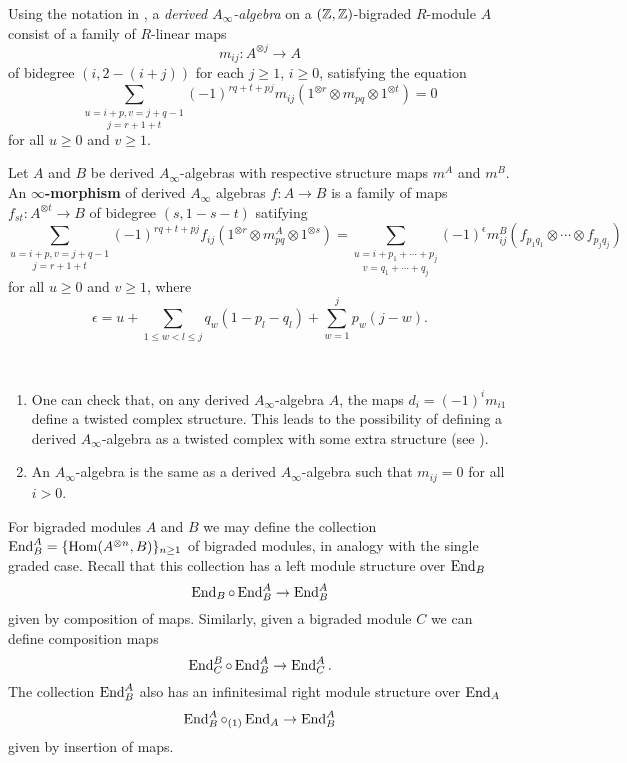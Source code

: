 \documentclass[twoside]{article}
\begin{document}
  \begin{defin}
  Using the notation in \cite{RW}, a \emph{derived $A_\infty$-algebra} on a $(\mathbb{Z},\mathbb{Z})$-bigraded $R$-module $A$ consist of a family of $R$-linear maps 
\[m_{ij}:A^{\otimes j}\to A\]
of bidegree $(i,2-(i+j))$ for each $j\geq 1$, $i\geq 0$, satisfying the equation
\[\underset{j=r+1+t}{\sum_{u=i+p, v=j+q-1}}(-1)^{rq+t+pj}m_{ij}(1^{\otimes r}\otimes m_{pq}\otimes 1^{\otimes t})=0\]
for all $u\geq 0$ and $v\geq 1$. 
\end{defin}

\begin{defin}
Let $A$ and $B$ be derived $A_\infty$-algebras with respective structure maps $m^A$ and $m^B$. An $\infty$\textbf{-morphism} of derived $A_\infty$ algebras $f:A\to B$ is a family of maps $f_{st}:A^{\otimes t}\to B$ of bidegree $(s,1-s-t)$ satifying
\begin{equation}\label{dinftymaps}
\underset{j=r+1+t}{\sum_{u=i+p, v=j+q-1}}(-1)^{rq+t+pj}f_{ij}(1^{\otimes r}\otimes m_{pq}^A\otimes 1^{\otimes s})=\underset{v=q_1+\cdots +q_j}{\sum_{u=i+p_1+\cdots +p_j}}(-1)^{\epsilon} m^B_{ij}(f_{p_1 q_1}\otimes\cdots\otimes f_{p_j q_j})
\end{equation}
for all $u\geq 0$ and $v\geq 1$, where
\[\epsilon = u + \sum_{1\leq w < l \leq j} q_w(1-p_l-q_l)  + \sum_{w=1}^j p_w(j-w).\]
\end{defin}
\begin{ex}\
\begin{enumerate}
\item One can check that, on any derived $A_\infty$-algebra $A$, the maps $d_i=(-1)^{i}m_{i1}$ define a twisted complex structure. This leads to the possibility of defining a derived $A_\infty$-algebra as a twisted complex with some extra structure (see ).
\item An $A_\infty$-algebra is the same as a derived $A_\infty$-algebra such that $m_{ij}=0$ for all $i>0$.
\end{enumerate}
\end{ex}

For bigraded modules $A$ and $B$ we may define the collection $\operatorname{End}^A_B=\{\operatorname{Hom}(A^{\otimes n}, B)\}_{n\geq 1}$ of bigraded modules,  in analogy with the single graded case. Recall that this collection has a left module structure over $\operatorname{End}_B$
\[\operatorname{End}_B\circ \operatorname{End}^A_B\to \operatorname{End}^A_B\]
given by composition of maps. Similarly, given a bigraded module $C$ we can define composition maps
\[\operatorname{End}^B_C\circ \operatorname{End}^A_B\to \operatorname{End}^A_C.\]
The collection $\operatorname{End}^A_B$ also has an infinitesimal right module structure over $\operatorname{End}_A$
\[\operatorname{End}^A_B\circ_{(1)}\operatorname{End}_A\to \operatorname{End}^A_B\]
given by insertion of maps.
\end{document}
